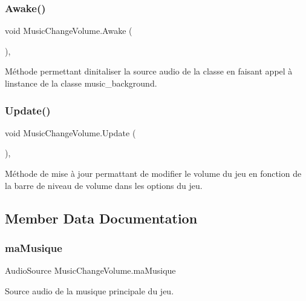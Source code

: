\subsubsection{\texorpdfstring{Awake()}{Awake()}}
{\footnotesize\ttfamily void Music\+Change\+Volume.\+Awake (\begin{DoxyParamCaption}{ }\end{DoxyParamCaption})\hspace{0.3cm}{\ttfamily [inline]}, {\ttfamily [private]}}

Méthode permettant d\textquotesingle{}initaliser la source audio de la classe en faisant appel à l\textquotesingle{}instance de la classe music\+\_\+background. \mbox{\label{class_music_change_volume_ae95b01bb297e22f730fce5bf8f8e7551}} 
\subsubsection{\texorpdfstring{Update()}{Update()}}
{\footnotesize\ttfamily void Music\+Change\+Volume.\+Update (\begin{DoxyParamCaption}{ }\end{DoxyParamCaption})\hspace{0.3cm}{\ttfamily [inline]}, {\ttfamily [private]}}

Méthode de mise à jour permattant de modifier le volume du jeu en fonction de la barre de niveau de volume dans les options du jeu. 

\subsection{Member Data Documentation}
\mbox{\label{class_music_change_volume_a04507c692c3c6116a349701b71049073}} 
\subsubsection{\texorpdfstring{ma\+Musique}{maMusique}}
{\footnotesize\ttfamily Audio\+Source Music\+Change\+Volume.\+ma\+Musique}

Source audio de la musique principale du jeu. \mbox{\label{class_music_change_volume_a14400f74c496eb4aef898efc2cc87239}} 
